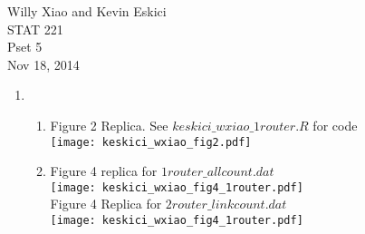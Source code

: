 \documentclass[paper=a4, fontsize=11pt]{scrartcl}
\begin{document}
\noindent Willy Xiao and Kevin Eskici \\ STAT 221 \\Pset 5\\ Nov 18, 2014
\begin{enumerate}
  \item
    \begin{enumerate}[1]
      \item Figure 2 Replica. See $keskici\_wxiao\_1router.R$ for code \\
      \texttt{[image: keskici\_wxiao\_fig2.pdf]}
      \newpage
      \item Figure 4 replica for $1router\_allcount.dat$ \\
      \texttt{[image: keskici\_wxiao\_fig4\_1router.pdf]}\\
      \newpage
      Figure 4 Replica for $2router\_linkcount.dat$ \\
      \texttt{[image: keskici\_wxiao\_fig4\_1router.pdf]}


\end{enumerate}
\end{enumerate}
\end{document}
